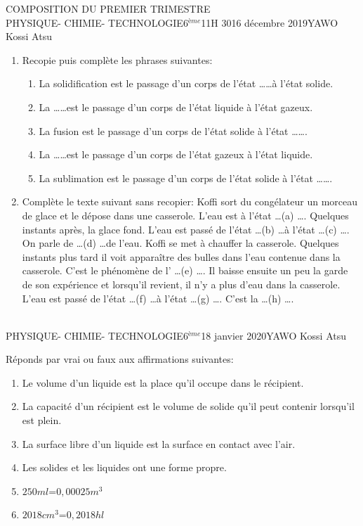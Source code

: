 \documentclass[12pt,a4paper]{book}
\newcommand{\prof}{YAWO Kossi Atsu}
\newcommand{\matiere}{\\PHYSIQUE- CHIMIE- TECHNOLOGIE}
\newcommand{\classe}{6$^{ème}$}
\begin{document}
\begin{devoir}{COMPOSITION DU PREMIER TRIMESTRE}{\matiere}{\classe}{1}{1H 30}{16 décembre 2019}{\prof}
\begin{exo}[9]
\begin{enumerate}
\item Recopie puis complète les phrases suivantes:
\begin{enumerate}
\item La solidification est le passage d'un corps de l'état \ldots \ldots à l'état solide.
\item La \ldots \ldots est le passage d'un corps de l'état liquide à l'état gazeux.
\item La fusion est le passage d'un corps de l'état solide à l'état \ldots \ldots.
\item La \ldots \ldots est le passage d'un corps de l'état gazeux à l'état liquide.
\item La sublimation est le passage d'un corps de l'état solide à l'état \ldots \ldots.
\end{enumerate}
\item Complète le texte suivant sans recopier:
Koffi sort du congélateur un morceau de glace et le dépose dans une casserole. L'eau est à l'état \ldots (a) \ldots . Quelques instants après, la glace fond. L'eau est passé de l'état \ldots (b) \ldots à l'état \ldots (c) \ldots . On parle de \ldots (d) \ldots de l'eau. Koffi se met à chauffer la casserole. Quelques instants plus tard il voit apparaître des bulles dans l'eau contenue dans la casserole. C'est le phénomène de l' \ldots (e) \ldots . Il baisse ensuite un peu la garde de son expérience et lorsqu'il revient, il n'y a plus d'eau dans la casserole. L'eau est passé de l'état \ldots (f) \ldots à l'état \ldots (g) \ldots. C'est la \ldots (h) \ldots.
\end{enumerate}
\end{exo}
\tableofcompetences
\end{devoir}

\newpage
\begin{td}{\matiere}{\classe}{18 janvier 2020}{\prof}
\begin{exo}
Réponds par vrai ou faux aux affirmations suivantes:
\begin{enumerate}
\item Le volume d'un liquide est la place qu'il occupe dans le récipient.
\item La capacité d'un récipient est le volume de solide qu'il peut contenir lorsqu'il est plein.
\item La surface libre d'un liquide est la surface en contact avec l'air.
\item Les solides et les liquides ont une forme propre.
\item $250ml$=$0,00025m^3$
\item $2018cm^3$=$0,2018hl$
\end{enumerate}
\end{exo}
\end{td}
\end{document}
